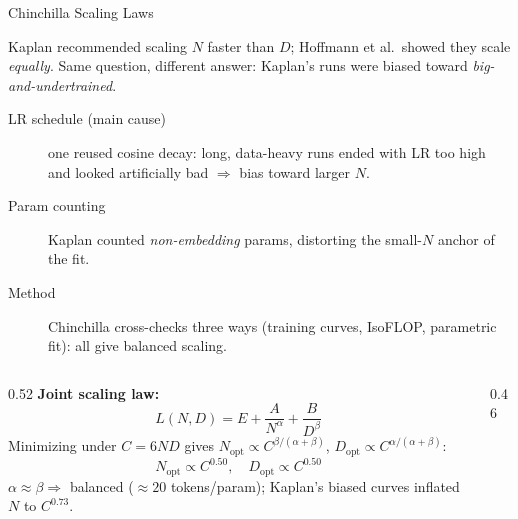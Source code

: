 \begin{frame}{Chinchilla Scaling Laws~\cite{hoffmann2022chinchilla}}

  Kaplan recommended scaling $N$ faster than $D$; Hoffmann et al.\ showed they scale \emph{equally}. Same question, different answer: Kaplan's runs were biased toward \emph{big-and-undertrained}.
  {\small
  \begin{description}
    \item[LR schedule (main cause)] one reused cosine decay: long, data-heavy runs ended with LR too high and looked artificially bad $\Rightarrow$ bias toward larger $N$.
    \item[Param counting] Kaplan counted \emph{non-embedding} params, distorting the small-$N$ anchor of the fit.
    \item[Method] Chinchilla cross-checks three ways (training curves, IsoFLOP, parametric fit): all give balanced scaling.
  \end{description}
  }

  \vspace{0.2em}
  \begin{columns}[T]
    \begin{column}{0.52\textwidth}
      \textbf{Joint scaling law:}
      \[
        L(N,D) = E + \frac{A}{N^{\alpha}} + \frac{B}{D^{\beta}}
      \]
      Minimizing under $C=6ND$ gives $N_{\text{opt}}\propto C^{\beta/(\alpha+\beta)}$, $D_{\text{opt}}\propto C^{\alpha/(\alpha+\beta)}$:
      \[
        N_{\text{opt}} \propto C^{0.50}, \quad D_{\text{opt}} \propto C^{0.50}
      \]
      {\small $\alpha\approx\beta \Rightarrow$ balanced ($\approx 20$ tokens/param); Kaplan's biased curves inflated $N$ to $C^{0.73}$.}
    \end{column}
    \begin{column}{0.46\textwidth}
      \centering


\end{column}
\end{columns}
\end{frame}
